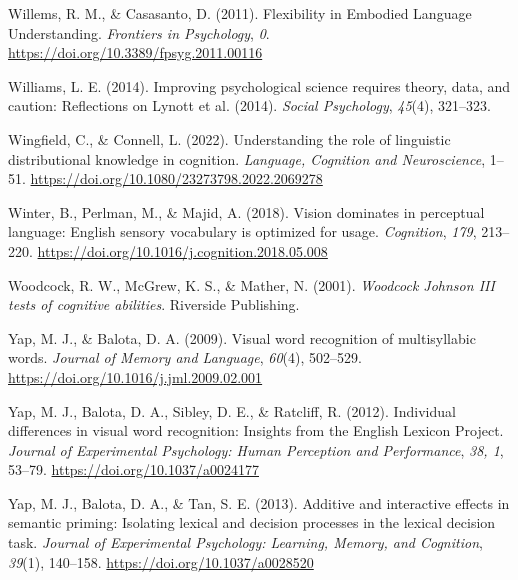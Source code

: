 \documentclass[
  12pt,
  man,floatsintext]{apa7}
\newlength{\cslhangindent}
\newlength{\cslentryspacingunit} %
\newenvironment{CSLReferences}[2] %
 {%
  \setlength{\parindent}{0pt}
  \ifodd #1
  \let\oldpar\par
  \def\par{\hangindent=\cslhangindent\oldpar}
  \fi
  \setlength{\parskip}{#2\cslentryspacingunit}
 }%
 {}
\begin{document}
\begin{CSLReferences}{1}{0}
\leavevmode{}%
Willems, R. M., \& Casasanto, D. (2011). Flexibility in {Embodied Language Understanding}. \emph{Frontiers in Psychology}, \emph{0}. \url{https://doi.org/10.3389/fpsyg.2011.00116}

\leavevmode{}%
Williams, L. E. (2014). Improving psychological science requires theory, data, and caution: {Reflections} on {Lynott} et al. (2014). \emph{Social Psychology}, \emph{45}(4), 321--323.

\leavevmode{}%
Wingfield, C., \& Connell, L. (2022). Understanding the role of linguistic distributional knowledge in cognition. \emph{Language, Cognition and Neuroscience}, 1--51. \url{https://doi.org/10.1080/23273798.2022.2069278}

\leavevmode{}%
Winter, B., Perlman, M., \& Majid, A. (2018). Vision dominates in perceptual language: {English} sensory vocabulary is optimized for usage. \emph{Cognition}, \emph{179}, 213--220. \url{https://doi.org/10.1016/j.cognition.2018.05.008}

\leavevmode{}%
Woodcock, R. W., McGrew, K. S., \& Mather, N. (2001). \emph{Woodcock {Johnson III} tests of cognitive abilities}. {Riverside Publishing}.

\leavevmode{}%
Yap, M. J., \& Balota, D. A. (2009). Visual word recognition of multisyllabic words. \emph{Journal of Memory and Language}, \emph{60}(4), 502--529. \url{https://doi.org/10.1016/j.jml.2009.02.001}

\leavevmode{}%
Yap, M. J., Balota, D. A., Sibley, D. E., \& Ratcliff, R. (2012). Individual differences in visual word recognition: {Insights} from the {English Lexicon Project}. \emph{Journal of Experimental Psychology: Human Perception and Performance}, \emph{38, 1}, 53--79. \url{https://doi.org/10.1037/a0024177}

\leavevmode{}%
Yap, M. J., Balota, D. A., \& Tan, S. E. (2013). Additive and interactive effects in semantic priming: {Isolating} lexical and decision processes in the lexical decision task. \emph{Journal of Experimental Psychology: Learning, Memory, and Cognition}, \emph{39}(1), 140--158. \url{https://doi.org/10.1037/a0028520}


\end{CSLReferences}
\end{document}
